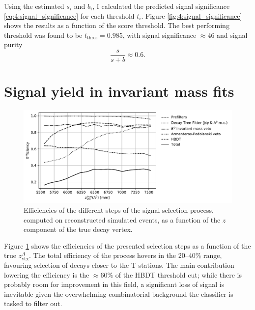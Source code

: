 Using the estimated $s_i$ and $b_i$, I calculated the predicted signal significance \eqref{eq:4:signal_significance} for each threshold $t_i$.
Figure \ref{fig:4:signal_significance} shows the results as a function of the score threshold.
The best performing threshold was found to be $t_\text{thres} = 0.985$, with signal significance $\approx 46$ and signal purity
\begin{equation}
	\frac{s}{s+b} \approx 0.6.
\end{equation}

\section{Signal yield in invariant mass fits}
\label{sec:4:performance_data}

\begin{figure}[t]
	\centering
	\includegraphics[width=\textwidth]{graphics/04-event_selection/selection_efficiencies.pdf}
	\caption{Efficiencies of the different steps of the \demonstratorshort signal selection process, computed on reconstructed simulated events, as a function of the $z$ component of the true \lambdadecay decay vertex.}
	\label{fig:4:selection_efficiencies}
\end{figure}

Figure \ref{fig:4:selection_efficiencies} shows the efficiencies of the presented selection steps as a function of the true $z_\mathrm{vtx}^\Lambda$.
The total efficiency of the process hovers in the 20--40\% range, favouring selection of decays closer to the T stations.
The main contribution lowering the efficiency is the $\approx 60\%$ of the HBDT threshold cut;
while there is probably room for improvement in this field, a significant loss of signal is inevitable given the overwhelming combinatorial background the classifier is tasked to filter out.

